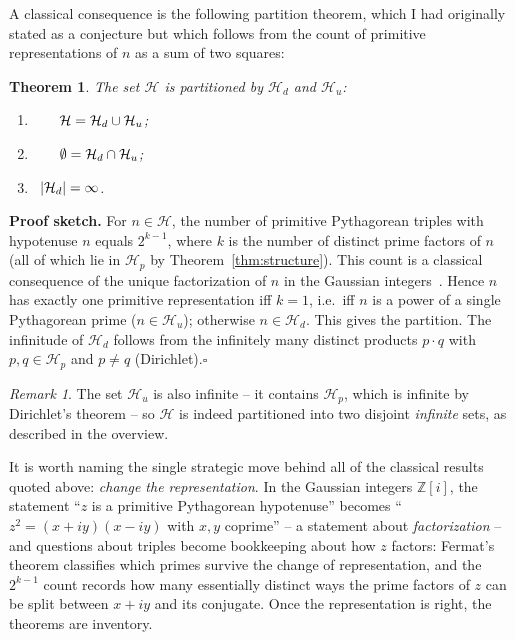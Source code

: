 \documentclass{article}
\theoremstyle{plain}
\newtheorem{theorem}{Theorem}
\theoremstyle{definition}
\theoremstyle{remark}
\newtheorem{remark}{Remark}
\begin{document}
A classical consequence is the following partition theorem, which I had originally
stated as a conjecture but which follows from the count of primitive
representations of $n$ as a sum of two squares:
\begin{theorem}\label{thm:partition}
The set $\mathcal{H}$ is partitioned by $\mathcal{H}_d$ and $\mathcal{H}_u$:
\begin{enumerate}
  \item[(a)] $\hphantom{|\mathcal{H}_d|}\mathcal{H} = \mathcal{H}_{d} \cup \mathcal{H}_u$;
  \item[(b)] $\hphantom{|\mathcal{H}_d|}\emptyset = \mathcal{H}_{d} \cap \mathcal{H}_u$;
  \item[(c)] $\hphantom{\emptyset}|\mathcal{H}_d| = \infty$.
\end{enumerate}
\end{theorem}

\textbf{Proof sketch.} For $n \in \mathcal{H}$, the number of primitive Pythagorean
triples with hypotenuse $n$ equals $2^{k-1}$, where $k$ is the number of
distinct prime factors of $n$ (all of which lie in $\mathcal{H}_p$ by
Theorem~\ref{thm:structure}).
This count is a classical consequence of the unique factorization of $n$ in
the Gaussian integers~\cite{sierpinski}. Hence $n$ has exactly one primitive representation iff
$k = 1$, i.e.\ iff $n$ is a power of a single Pythagorean prime ($n \in \mathcal{H}_u$);
otherwise $n \in \mathcal{H}_d$. This gives the partition. The infinitude of
$\mathcal{H}_d$ follows from the infinitely many distinct products $p \cdot q$
with $p, q \in \mathcal{H}_p$ and $p \neq q$ (Dirichlet).\hfill$\square$

\begin{remark}
The set $\mathcal{H}_u$ is also infinite -- it contains $\mathcal{H}_p$, which
is infinite by Dirichlet's theorem -- so $\mathcal{H}$ is indeed partitioned
into two disjoint {\em infinite\/} sets, as described in the overview.
\end{remark}

It is worth naming the single strategic move behind all of the classical
results quoted above: {\em change the representation}. In the Gaussian
integers $\mathbb{Z}[i]$, the statement ``$z$ is a primitive Pythagorean
hypotenuse'' becomes ``$z^2 = (x + iy)(x - iy)$ with $x, y$ coprime'' -- a
statement about {\em factorization\/} -- and questions about triples become
bookkeeping about how $z$ factors: Fermat's theorem classifies which primes
survive the change of representation, and the $2^{k-1}$ count records how
many essentially distinct ways the prime factors of $z$ can be split
between $x + iy$ and its conjugate. Once the representation is right, the
theorems are inventory.
\end{document}
